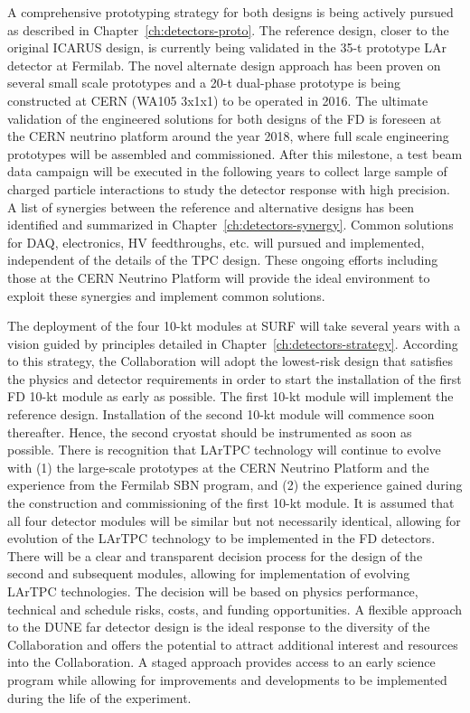 A comprehensive prototyping strategy for both designs is being actively
pursued as described in Chapter~\ref{ch:detectors-proto}.  The
reference design, closer to the original ICARUS design, is currently
being validated in the 35-t prototype LAr detector at Fermilab.  The
novel alternate design approach has been proven on
several small scale prototypes and a 20-t dual-phase
prototype is being constructed at CERN (WA105 3x1x1) to be
operated in 2016.  The ultimate validation of the engineered solutions
for both designs of the FD is foreseen at the CERN neutrino platform
around the year 2018, where full scale engineering prototypes will be
assembled and commissioned. After this milestone, a test beam data
campaign will be executed in the following years to collect large
sample of charged particle interactions to study the detector response
with high precision. A list of synergies
between the reference and alternative designs has been identified and
summarized in Chapter~\ref{ch:detectors-synergy}. Common solutions for
DAQ, electronics, HV feedthroughs, etc. will pursued and
implemented, independent of the details of the TPC design. These ongoing
efforts including those at the CERN Neutrino Platform will provide the ideal
environment to exploit these synergies and implement common solutions.

The deployment of the four 10-kt modules at SURF will take several
years with a vision guided by principles detailed in
Chapter~\ref{ch:detectors-strategy}. According to this strategy, the
Collaboration will adopt the lowest-risk design that satisfies the
physics and detector requirements in order to start the
installation of the first FD 10-kt module as early as possible.
The first 10-kt module will implement the reference design.   
Installation of the second 10-kt module will commence
soon thereafter.  Hence, the second cryostat should be
instrumented as soon as possible.  There is recognition that
LArTPC technology will continue to evolve with (1) the large-scale
prototypes at the CERN Neutrino Platform and the experience from the
Fermilab SBN program, and (2) the experience gained during the
construction and commissioning of the first 10-kt module.  It is
assumed that all four detector modules will be similar but not
necessarily identical, allowing for evolution of the LArTPC
technology to be implemented in the FD detectors. There will be a
clear and transparent decision process for the design of the second
and subsequent modules, allowing for implementation of evolving LArTPC
technologies. The decision will be based on physics performance,
technical and schedule risks, costs, and funding opportunities.  A
flexible approach to the DUNE far detector design is the ideal
response to the diversity of the Collaboration and offers the
potential to attract additional interest and resources into the
Collaboration. A staged approach provides access to an early science
program while allowing for improvements and developments to be
implemented during the life of the experiment.

